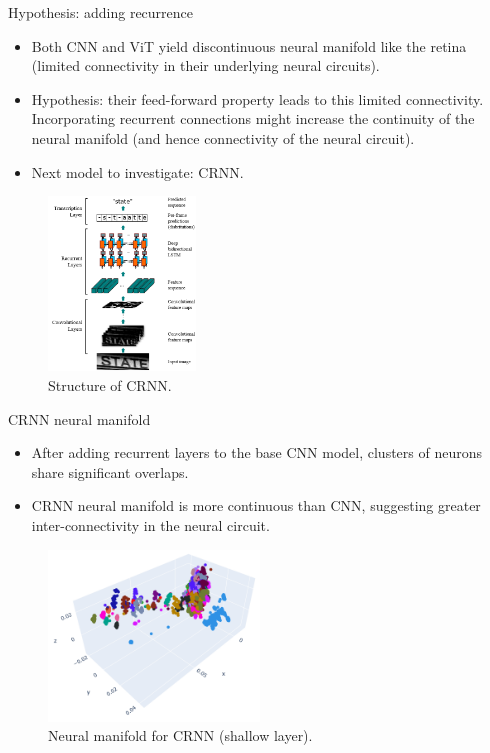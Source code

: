 \documentclass[xcolor={dvipsnames,svgnames}]{beamer}
\begin{document}
\begin{frame}{Hypothesis: adding recurrence}
\begin{itemize}
    \item Both CNN and ViT yield discontinuous neural manifold like the retina (limited connectivity in their underlying neural circuits).
    \item Hypothesis: their feed-forward property leads to this limited connectivity. Incorporating recurrent connections might increase the continuity of the neural manifold (and hence connectivity of the neural circuit).
    \item Next model to investigate: CRNN.
\end{itemize}    
\begin{figure}[H]
\centering
    \includegraphics[width=0.35\textwidth]{figures/artificial/crnn.PNG}
\caption{Structure of CRNN.}
\end{figure}
\end{frame}

\begin{frame}{CRNN neural manifold}
\begin{itemize}
    \item After adding recurrent layers to the base CNN model, clusters of neurons share significant overlaps. 
    \item CRNN neural manifold is more continuous than CNN, suggesting greater inter-connectivity in the neural circuit. 
\end{itemize}
    \begin{figure}[H]
\centering
    \includegraphics[width=0.5\textwidth]{figures/embeddings/crnn-2d-layer1.png}
\caption{Neural manifold for CRNN (shallow layer).}
\end{figure}
\end{frame}
\end{document}

